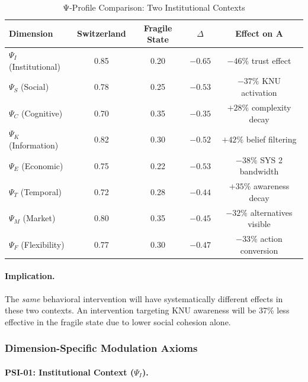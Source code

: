 \begin{table}[htbp]
\centering
\caption{Ψ-Profile Comparison: Two Institutional Contexts}
\label{tab:psi-profile-comparison}
\small
\renewcommand{\arraystretch}{1.3}
\begin{tabular}{@{}lcccc@{}}
\toprule
\textbf{Dimension} & \textbf{Switzerland} & \textbf{Fragile State} & $\Delta$ & \textbf{Effect on A} \\
\midrule
$\Psi_I$ (Institutional) & 0.85 & 0.20 & $-0.65$ & $-46\%$ trust effect \\
$\Psi_S$ (Social) & 0.78 & 0.25 & $-0.53$ & $-37\%$ KNU activation \\
$\Psi_C$ (Cognitive) & 0.70 & 0.35 & $-0.35$ & $+28\%$ complexity decay \\
$\Psi_K$ (Information) & 0.82 & 0.30 & $-0.52$ & $+42\%$ belief filtering \\
$\Psi_E$ (Economic) & 0.75 & 0.22 & $-0.53$ & $-38\%$ SYS 2 bandwidth \\
$\Psi_T$ (Temporal) & 0.72 & 0.28 & $-0.44$ & $+35\%$ awareness decay \\
$\Psi_M$ (Market) & 0.80 & 0.35 & $-0.45$ & $-32\%$ alternatives visible \\
$\Psi_F$ (Flexibility) & 0.77 & 0.30 & $-0.47$ & $-33\%$ action conversion \\
\bottomrule
\end{tabular}
\end{table}

\paragraph{Implication.}
The \emph{same} behavioral intervention will have systematically different effects in these two contexts. An intervention targeting KNU awareness will be 37\% less effective in the fragile state due to lower social cohesion alone.

\subsubsection{Dimension-Specific Modulation Axioms}

\paragraph{PSI-01: Institutional Context ($\Psi_I$).}

